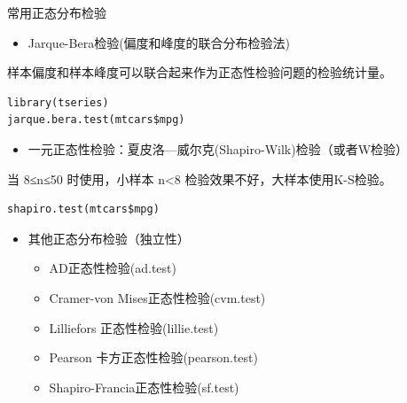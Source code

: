 \documentclass[presentation]{beamer}
\begin{document}
\begin{frame}[fragile,label={sec:org356975b}]{常用正态分布检验}
 \begin{itemize}
\item Jarque-Bera检验(偏度和峰度的联合分布检验法)
\end{itemize}
样本偏度和样本峰度可以联合起来作为正态性检验问题的检验统计量。  
\begin{verbatim}
library(tseries)
jarque.bera.test(mtcars$mpg)
\end{verbatim}
\begin{itemize}
\item 一元正态性检验：夏皮洛—威尔克(Shapiro-Wilk)检验（或者W检验）
\end{itemize}
当 8≤n≤50 时使用，小样本 n<8 检验效果不好，大样本使用K-S检验。
\begin{verbatim}
shapiro.test(mtcars$mpg)
\end{verbatim}

\begin{itemize}
\item 其他正态分布检验（独立性）
\begin{itemize}
\item AD正态性检验(ad.test)
\item Cramer-von Mises正态性检验(cvm.test)
\item Lilliefors 正态性检验(lillie.test)
\item Pearson 卡方正态性检验(pearson.test)
\item Shapiro-Francia正态性检验(sf.test)
\end{itemize}
\end{itemize}
\end{frame}
\end{document}
